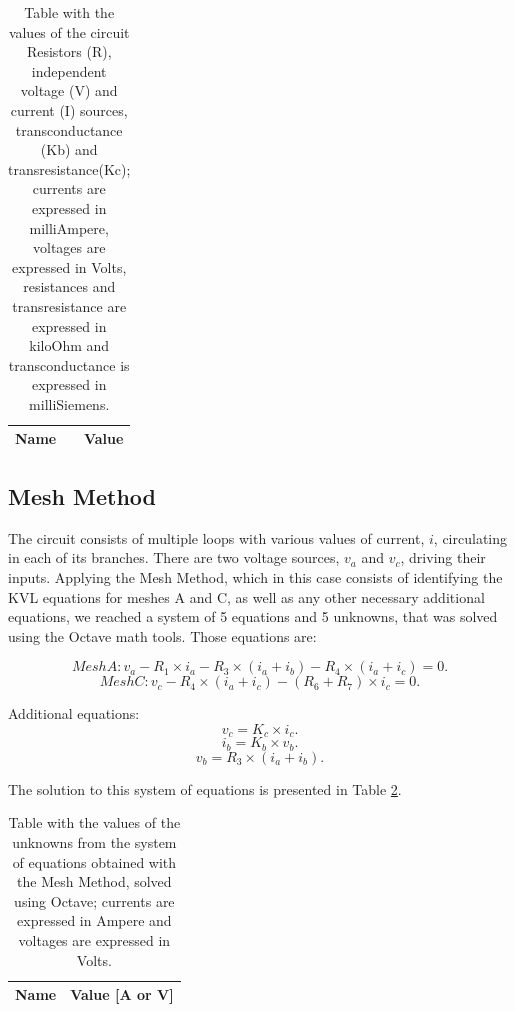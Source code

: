 \begin{table}[h]
  \centering
  \begin{tabular}{|l|r|}
    \hline    
    {\bf Name} & {\bf Value} \\ \hline
    
  \end{tabular}
  \caption{Table with the values of the circuit Resistors (R), independent voltage (V) and current (I) sources, transconductance (Kb) and transresistance(Kc); currents are expressed in milliAmpere, voltages are expressed in Volts, resistances and transresistance are expressed in kiloOhm and transconductance is expressed in milliSiemens.}
  \label{tab:data}
\end{table}


\subsection{Mesh Method}

The circuit consists of multiple loops with various values of current, $i$, circulating in each of its branches. There are two
voltage sources, $v_a$ and $v_c$, driving their inputs. Applying the Mesh Method, which in this case consists of identifying the KVL equations for meshes A and C, as well as any other necessary additional equations, we reached a system of 5 equations and 5 unknowns, that was solved using the Octave math tools. Those equations are:

\begin{equation}
  Mesh A : v_a - R_1 \times i_a - R_3 \times (i_a + i_b) - R_4 \times (i_a + i_c) = 0.
\end{equation}
\begin{equation}
  Mesh C : v_c - R_4 \times (i_a + i_c) - (R_6 + R_7) \times i_c = 0.
\end{equation}

Additional equations:
\begin{equation}
  v_c = K_c \times i_c.
\end{equation}
\begin{equation}
  i_b = K_b \times v_b.
\end{equation}
\begin{equation}
  v_b = R_3 \times (i_a + i_b).
\end{equation}

\newpage

The solution to this system of equations is presented in Table \ref{tab:node}. 

\begin{table}[h]
  \centering
  \begin{tabular}{|l|r|}
    \hline    
    {\bf Name} & {\bf Value [A or V]} \\ \hline
    
  \end{tabular}
  \caption{Table with the values of the unknowns from the system of equations obtained with the Mesh Method, solved using Octave; currents are expressed in Ampere and voltages are expressed in Volts.}
  \label{tab:node}
\end{table}


